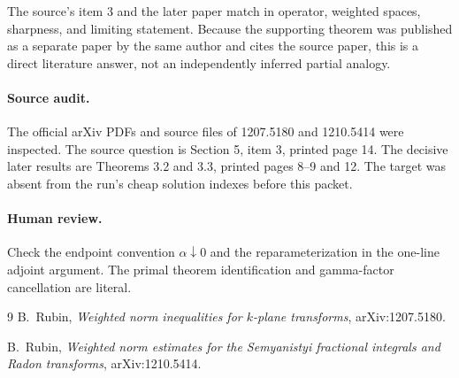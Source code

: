 \documentclass[11pt]{article}
\begin{document}
The source's item 3 and the later paper match in operator, weighted spaces,
sharpness, and limiting statement.  Because the supporting theorem was
published as a separate paper by the same author and cites the source paper,
this is a direct literature answer, not an independently inferred partial
analogy.

\paragraph{Source audit.}
The official arXiv PDFs and source files of 1207.5180 and 1210.5414 were
inspected.  The source question is Section 5, item 3, printed page 14.  The
decisive later results are Theorems 3.2 and 3.3, printed pages 8--9 and 12.
The target was absent from the run's cheap solution indexes before this
packet.

\paragraph{Human review.}
Check the endpoint convention $\alpha\downarrow0$ and the reparameterization
in the one-line adjoint argument.  The primal theorem identification and
gamma-factor cancellation are literal.

\begin{thebibliography}{9}
B.~Rubin,
\emph{Weighted norm inequalities for $k$-plane transforms},
arXiv:1207.5180.

B.~Rubin,
\emph{Weighted norm estimates for the Semyanistyi fractional integrals and
Radon transforms}, arXiv:1210.5414.
\end{thebibliography}
\end{document}

